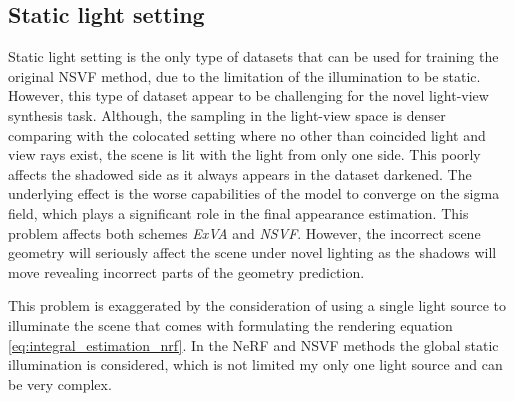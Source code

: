 

% 










\subsection{Static light setting}


Static light setting is the only type of datasets that can be used
for training the original NSVF method,
due to the limitation of the illumination to be static.
However, this type of dataset appear to be challenging for the novel light-view synthesis task.
Although, the sampling in the light-view space is denser comparing with the colocated setting
where no other than coincided light and view rays exist,
the scene is lit with the light from only one side.
This poorly affects the shadowed side as it always appears in the dataset darkened.
The underlying effect is the worse capabilities of the model to converge on the sigma field,
which plays a significant role in the final appearance estimation.
This problem affects both schemes \textit{ExVA} and \textit{NSVF}.
However, the incorrect scene geometry will seriously affect the scene under novel lighting
as the shadows will move revealing incorrect parts of the geometry prediction.

This problem is exaggerated by the consideration of using a single light source to illuminate the scene
that comes with formulating the rendering equation \cref{eq:integral_estimation_nrf}.
In the NeRF and NSVF methods the global static illumination is considered,
which is not limited my only one light source and can be very complex.

